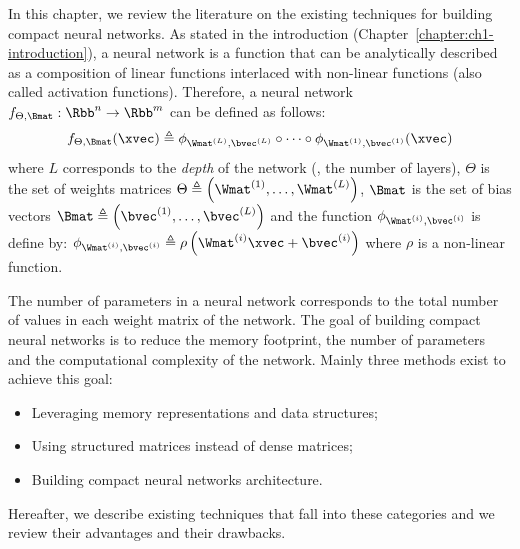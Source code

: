 In this chapter, we review the literature on the existing techniques for building compact neural networks.
As stated in the introduction (Chapter~\ref{chapter:ch1-introduction}), a neural network is a function that can be analytically described as a composition of linear functions interlaced with non-linear functions (also called activation functions).
Therefore, a neural network $f_{\Theta,\Bmat} : \Rbb^n \rightarrow \Rbb^m$ can be defined as follows:
\begin{equation}
  f_{\Theta,\Bmat}(\xvec) \triangleq \phi_{\Wmat^{(L)}, \bvec^{(L)}} \circ \cdots \circ \phi_{\Wmat^{(1)}, \bvec^{(1)}}(\xvec)
  \label{equation:p1-ch3_neural_network}
\end{equation}
where $L$ corresponds to the \emph{depth} of the network (\ie, the number of layers), $\Theta$ is the set of weights matrices $\Theta \triangleq \left( \Wmat^{(1)}, \dots, \Wmat^{(L)} \right)$, $\Bmat$ is the set of bias vectors $\Bmat \triangleq \left( \bvec^{(1)}, \dots, \bvec^{(L)} \right)$ and the function $\phi_{\Wmat^{(i)},\bvec^{(i)}}$ is define by: $\phi_{\Wmat^{(i)},\bvec^{(i)}} \triangleq \rho\left(\Wmat^{(i)}\xvec + \bvec^{(i)}\right)$ where $\rho$ is a non-linear function.


The number of parameters in a neural network corresponds to the total number of values in each weight matrix of the network.
The goal of building compact neural networks is to reduce the memory footprint, the number of parameters and the computational complexity of the network. 
Mainly three methods exist to achieve this goal:
\begin{itemize}
  \item Leveraging memory representations and data structures;
  \item Using structured matrices instead of dense matrices;
  \item Building compact neural networks architecture.
\end{itemize}
Hereafter, we describe existing techniques that fall into these categories and we review their advantages and their drawbacks.


